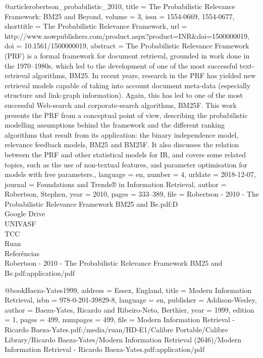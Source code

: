 
@article{robertson_probabilistic_2010,
	title = {The {Probabilistic} {Relevance} {Framework}: {BM}25 and {Beyond}},
	volume = {3},
	issn = {1554-0669, 1554-0677},
	shorttitle = {The {Probabilistic} {Relevance} {Framework}},
	url = {http://www.nowpublishers.com/product.aspx?product=INR&doi=1500000019},
	doi = {10.1561/1500000019},
	abstract = {The Probabilistic Relevance Framework (PRF) is a formal framework for document retrieval, grounded in work done in the 1970–1980s, which led to the development of one of the most successful text-retrieval algorithms, BM25. In recent years, research in the PRF has yielded new retrieval models capable of taking into account document meta-data (especially structure and link-graph information). Again, this has led to one of the most successful Web-search and corporate-search algorithms, BM25F. This work presents the PRF from a conceptual point of view, describing the probabilistic modelling assumptions behind the framework and the diﬀerent ranking algorithms that result from its application: the binary independence model, relevance feedback models, BM25 and BM25F. It also discusses the relation between the PRF and other statistical models for IR, and covers some related topics, such as the use of non-textual features, and parameter optimisation for models with free parameters.},
	language = {en},
	number = {4},
	urldate = {2018-12-07},
	journal = {Foundations and Trends® in Information Retrieval},
	author = {Robertson, Stephen},
	year = {2010},
	pages = {333--389},
	file = {Robertson - 2010 - The Probabilistic Relevance Framework BM25 and Be.pdf:D\:\\Google Drive\\UNIVASF\\TCC\\Ruan\\Referências\\Robertson - 2010 - The Probabilistic Relevance Framework BM25 and Be.pdf:application/pdf}
}

@book{Baeza-Yates1999,
	address = {Essex, England},
	title = {Modern {Information} {Retrieval}},
	isbn = {978-0-201-39829-8},
	language = {en},
	publisher = {Addison-Wesley},
	author = {Baeza-Yates, Ricardo and Ribeiro-Neto, Berthier},
	year = {1999},
	edition  = {1},
    pages = {499},
    numpages = {499},
	file = {Modern Information Retrieval - Ricardo Baeza-Yates.pdf:/media/ruan/HD-E1/Calibre Portable/Calibre Library/Ricardo Baeza-Yates/Modern Information Retrieval (2646)/Modern Information Retrieval - Ricardo Baeza-Yates.pdf:application/pdf}
}

